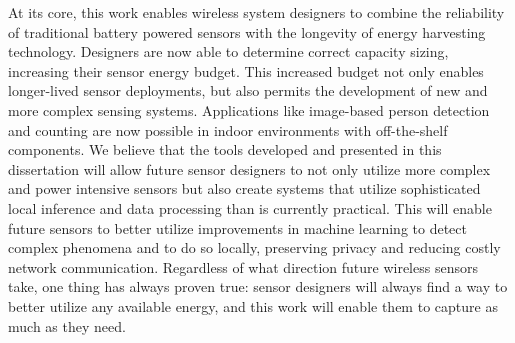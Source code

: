 At its core, this work enables wireless system designers to combine the reliability of traditional battery powered sensors with the longevity of energy harvesting technology.
Designers are now able to determine correct capacity sizing, increasing their sensor energy budget.
This increased budget not only enables longer-lived sensor deployments, but also permits the development of new and more complex sensing systems.
Applications like image-based person detection and counting are now possible in indoor environments with off-the-shelf components.
We believe that the tools developed and presented in this dissertation will allow future sensor designers to not only utilize more complex and power intensive sensors but also create systems that utilize sophisticated local inference and data processing than is currently practical.
This will enable future sensors to better utilize improvements in machine learning to detect complex phenomena and to do so locally, preserving privacy and reducing costly network communication.
Regardless of what direction future wireless sensors take, one thing has always proven true: sensor designers will always find a way to better utilize any available energy, and this work will enable them to capture as much as they need.

